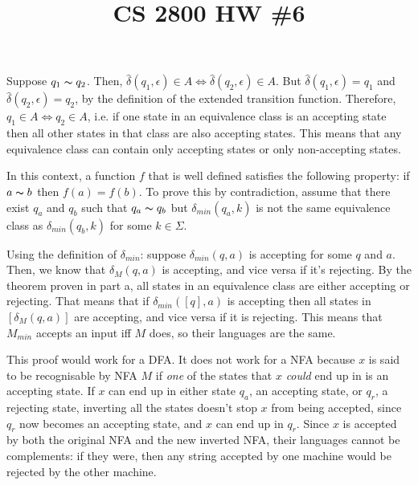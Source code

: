 

\title{CS 2800 HW \#6}
\author{\name}
\maketitle


Suppose $q_1 \thicksim q_2$. Then, $\hat{\delta}(q_1, \epsilon) \in A \iff \hat{\delta}(q_2, \epsilon) \in A$. But $\hat{\delta}(q_1, \epsilon) = q_1$ and $\hat{\delta}(q_2, \epsilon) = q_2$, by the definition of the extended transition function. Therefore, $q_1 \in A \iff q_2 \in A$, i.e. if one state in an equivalence class is an accepting state then all other states in that class are also accepting states. This means that any equivalence class can contain only accepting states or only non-accepting states.

In this context, a function $f$ that is well defined satisfies the following property: if $a \thicksim b$ then $f(a) = f(b)$. To prove this by contradiction, assume that there exist $q_a$ and $q_b$ such that $q_a \thicksim q_b$ but $\delta_{min}(q_a, k)$ is not the same equivalence class as $\delta_{min}(q_b, k)$ for some $k \in \Sigma$.

Using the definition of $\delta_{min}$: suppose $\delta_{min}(q, a)$ is accepting for some $q$ and $a$. Then, we know that $\delta_{M}(q, a)$ is accepting, and vice versa if it's rejecting. By the theorem proven in part a, all states in an equivalence class are either accepting or rejecting. That means that if $\delta_{min}([q], a)$ is accepting then all states in $[\delta_{M}(q, a)]$ are accepting, and vice versa if it is rejecting. This means that $M_{min}$ accepts an input iff $M$ does, so their languages are the same.


This proof would work for a DFA. It does not work for a NFA because $x$ is said to be recognisable by NFA $M$ if \textit{one} of the states that $x$ \textit{could} end up in is an accepting state. If $x$ can end up in either state $q_a$, an accepting state, or $q_r$, a rejecting state, inverting all the states doesn't stop $x$ from being accepted, since $q_r$ now becomes an accepting state, and $x$ can end up in $q_r$. Since $x$ is accepted by both the original NFA and the new inverted NFA, their languages cannot be complements: if they were, then any string accepted by one machine would be rejected by the other machine.

